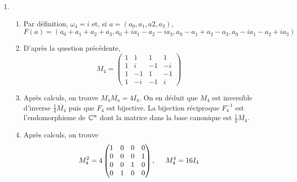 \begin{enumerate}
 \item
\begin{enumerate}
 \item Par définition, $\omega_4=i$ et, si $a=(a_0,a_1,a2,a_3)$,
\begin{displaymath}
 F(a)= (a_0+a_1+a_2+a_3, a_0+ia_1-a_2-ia_3,a_0-a_1+a_2-a_3,a_0-ia_1-a_2+ia_3)
\end{displaymath}

 \item D'après la question précédente,
\begin{displaymath}
 M_4=
\begin{pmatrix}
 1 & 1  & 1  & 1  \\ 
 1 & i  & -1 & -i \\
 1 & -1 & 1  & -1 \\
 1 & -i & -1 & i
\end{pmatrix}
\end{displaymath}

 \item Après calculs, on trouve $M_4 \overline{M_a}=4I_4$. On en déduit que $M_4$ est inversible d'inverse $\frac{1}{4}\overline{M_4}$ puis que $F_4$ est bijective. La bijection réciproque $F_4^{-1}$ est l'endomorphisme de $\mathbb{C}^n$ dont la matrice dans la base canonique est $\frac{1}{4}\overline{M_4}$.
 \item Après calculs, on trouve
\begin{displaymath}
 M_4^2= 4
\begin{pmatrix}
 1 & 0 & 0 & 0  \\ 
 0 & 0 & 0 & 1 \\
 0 & 0 & 1  & 0 \\
 0 & 1 & 0 & 0
\end{pmatrix},
\hspace{0.5cm}
M_4^4 = 16 I_4
\end{displaymath}
\end{enumerate}
 

\end{enumerate}
